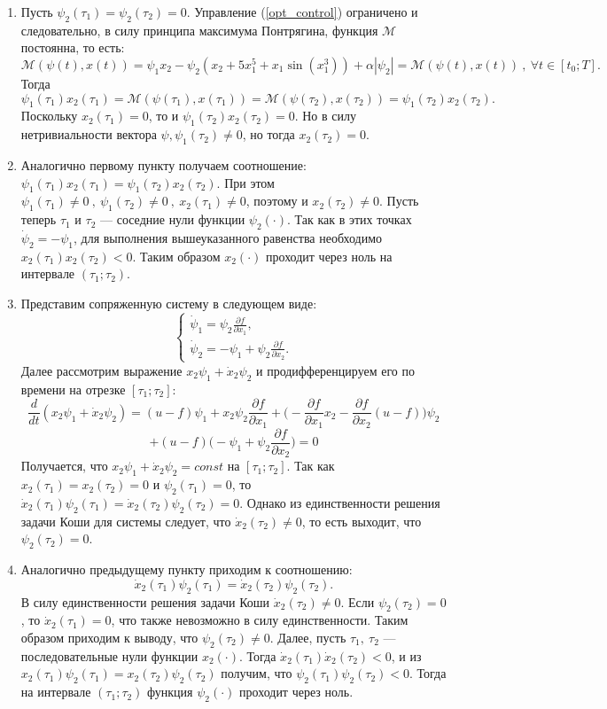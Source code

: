 \documentclass[11pt]{article}
\begin{document}
\begin{enumerate}
	\item Пусть \( \psi_2(\tau_1) = \psi_2(\tau_2) = 0 \). Управление (\ref{opt_control}) ограничено и следовательно, в силу принципа максимума Понтрягина, функция \( \mathcal{M} \) постоянна, то есть:
	\[ \mathcal{M}(\psi(t),x(t)) = \psi_1 x_2 - \psi_2(x_2 + 5x_1^5 + x_1 \sin(x_1^3)) + \alpha|\psi_2| = \mathcal{M}(\psi(t), x(t)) \ , \ \forall t \in [t_0; T]. \]
	Тогда 
	\[ \psi_1(\tau_1)x_2(\tau_1) = \mathcal{M}(\psi(\tau_1),x(\tau_1)) = \mathcal{M}(\psi(\tau_2), x(\tau_2)) = \psi_1(\tau_2) x_2(\tau_2). \] 
	Поскольку \( x_2(\tau_1) = 0 \), то и \( \psi_1(\tau_2) x_2(\tau_2) = 0 \). Но в силу нетривиальности вектора \( \psi , \psi_1(\tau_2 ) \ne 0 \), но тогда \( x_2(\tau_2) = 0 \).
	\item Аналогично первому пункту получаем соотношение: \( \psi_1(\tau_1) x_2(\tau_1) = \psi_1(\tau_2) x_2(\tau_2) \).  При этом \( \psi_1(\tau_1) \ne 0 \ , \ \psi_1(\tau_2) \ne 0 \ , \ x_2(\tau_1) \ne 0 \), поэтому и \( x_2(\tau_2) \ne 0 \). Пусть теперь \( \tau_1 \) и \( \tau_2 \) --- соседние нули функции \( \psi_2(\cdot) \). Так как в этих точках \( \dot{\psi}_2 = -\psi_1 \), для выполнения вышеуказанного равенства необходимо \( x_2(\tau_1) x_2(\tau_2) < 0 \). Таким образом \( x_2(\cdot) \) проходит через ноль на интервале \( (\tau_1; \tau_2) \).
	\item Представим сопряженную систему в следующем виде:
	\[ \begin{cases}
		\dot{\psi}_1 = \psi_2 \frac{\partial f}{\partial x_1},
		\\
		\dot{\psi}_2 = -\psi_1 + \psi_2 \frac{\partial f}{\partial x_2}.
	    \end{cases} \]
	Далее рассмотрим выражение \( x_2 \psi_1 + \dot{x}_2 \psi_2 \) и продифференцируем его по времени на отрезке \( [\tau_1; \tau_2 ] \):
	\[ \frac{d}{dt}(x_2 \psi_1 + \dot{x}_2 \psi_2) = (u - f)\psi_1 + x_2 \psi_2 \frac{\partial f}{\partial x_1} + \Big( -\frac{\partial f}{\partial x_1} x_2 - \frac{\partial f}{\partial x_2}(u - f) \Big) \psi_2 \] \[ + (u - f) \Big(-\psi_1 + \psi_2 \frac{\partial f}{\partial x_2} \Big) = 0 \]
	Получается, что \(x_2 \psi_1 + \dot{x}_2 \psi_2 = const\) на \( [\tau_1; \tau_2] \). Так как \( x_2(\tau_1) = x_2(\tau_2) = 0 \) и \( \psi_2(\tau_1) = 0 \),  то \( \dot{x}_2(\tau_1) \psi_2(\tau_1) = \dot{x}_2(\tau_2)\psi_2(\tau_2) = 0 \). Однако из единственности решения задачи Коши для системы следует, что \( \dot{x}_2(\tau_2) \ne 0 \), то есть выходит, что \( \psi_2(\tau_2) = 0 \).
	\item Аналогично предыдущему пункту приходим к соотношению: \[ \dot{x}_2(\tau_1) \psi_2(\tau_1) = \dot{x}_2 (\tau_2) \psi_2(\tau_2). \] В силу единственности решения задачи Коши \( \dot{x}_2(\tau_2) \ne 0 \). Если \( \psi_2(\tau_2) = 0 \), то \( \dot{x}_2(\tau_1) = 0 \), что также невозможно в силу единственности. Таким образом приходим к выводу, что \( \psi_2(\tau_2) \ne 0 \). Далее, пусть \( \tau_1, \ \tau_2 \) --- последовательные нули функции \( x_2(\cdot) \). Тогда \( \dot{x}_2(\tau_1) \dot{x}_2(\tau_2) < 0 \), и из \( x_2(\tau_1) \psi_2(\tau_1) = x_2(\tau_2) \psi_2(\tau_2) \) получим, что \( \psi_2(\tau_1) \psi_2(\tau_2) < 0 \). Тогда на интервале \( (\tau_1; \tau_2) \) функция \( \psi_2(\cdot) \) проходит через ноль.

\end{enumerate}
\end{document}

